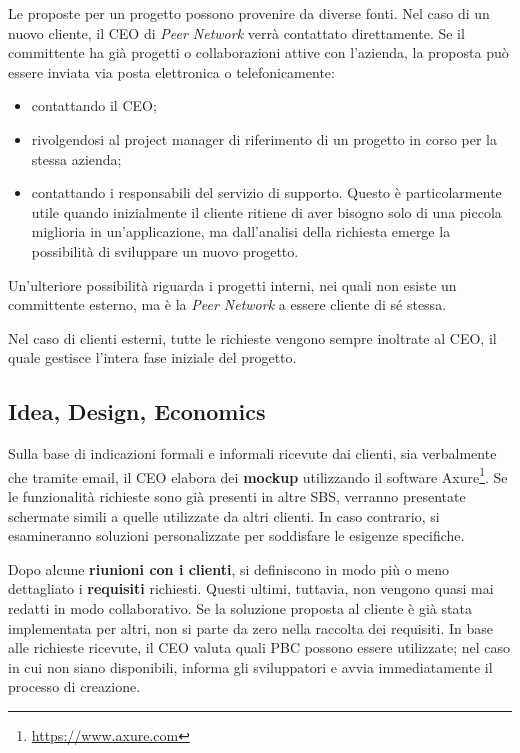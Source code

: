 Le proposte per un progetto possono provenire da diverse fonti. Nel caso di un nuovo cliente, il CEO di \textit{Peer Network} verrà contattato direttamente.
Se il committente ha già progetti o collaborazioni attive con l’azienda, la proposta può essere inviata via posta elettronica o telefonicamente:
\begin{itemize}
    \item contattando il CEO;
    \item rivolgendosi al project manager di riferimento di un progetto in corso per la stessa azienda;
    \item contattando i responsabili del servizio di supporto. Questo è particolarmente utile quando inizialmente 
    il cliente ritiene di aver bisogno solo di una piccola miglioria in un'applicazione, ma dall'analisi della
    richiesta emerge la possibilità di sviluppare un nuovo progetto.
\end{itemize}

Un'ulteriore possibilità riguarda i progetti interni, nei quali non esiste un committente esterno, ma è la \textit{Peer Network} a essere cliente di sé stessa.

Nel caso di clienti esterni, tutte le richieste vengono sempre inoltrate al CEO, il quale gestisce l'intera fase iniziale del progetto.

    \subsection{Idea, Design, Economics}
    Sulla base di indicazioni formali e informali ricevute dai clienti, sia verbalmente che tramite email, il
    CEO elabora dei \textbf{mockup} utilizzando il software Axure\footnote{\url{https://www.axure.com}}. Se le funzionalità richieste sono già presenti in altre
    \ac{SBS}, verranno presentate schermate simili a quelle utilizzate da altri clienti. In caso contrario,
    si esamineranno soluzioni personalizzate per soddisfare le esigenze specifiche.

    Dopo alcune \textbf{riunioni con i clienti}, si definiscono in modo più o meno dettagliato i \textbf{requisiti} richiesti. Questi ultimi,
    tuttavia, non vengono quasi mai redatti in modo collaborativo. Se la soluzione proposta al cliente è già stata
    implementata per altri, non si parte da zero nella raccolta dei requisiti. In base alle richieste ricevute, il CEO
    valuta quali \ac{PBC} possono essere utilizzate; nel caso in cui non siano disponibili, informa gli sviluppatori e avvia
    immediatamente il processo di creazione.

